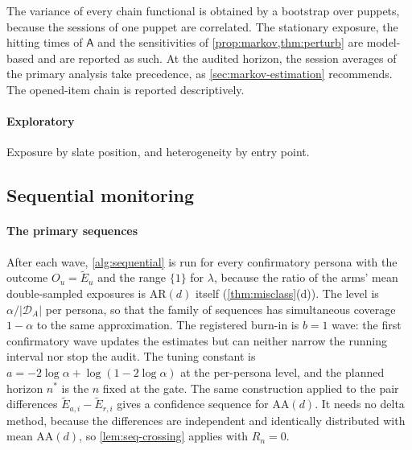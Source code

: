 The variance of every chain functional is obtained by a bootstrap over puppets, because the sessions of one puppet are correlated. The stationary exposure, the hitting times of $\mathsf A$ and the sensitivities of \cref{prop:markov,thm:perturb} are model-based and are reported as such. At the audited horizon, the session averages of the primary analysis take precedence, as \cref{sec:markov-estimation} recommends. The opened-item chain is reported descriptively.

\paragraph{Exploratory}
Exposure by slate position, and heterogeneity by entry point.

\subsection{Sequential monitoring}\label{sec:prot-monitoring}

\paragraph{The primary sequences}
After each wave, \cref{alg:sequential} is run for every confirmatory persona with the outcome $O_u=\widetilde E_u$ and the range $\{1\}$ for $\lambda$, because the ratio of the arms' mean double-sampled exposures is $\mathrm{AR}(d)$ itself (\cref{thm:misclass}(d)). The level is $\alpha/|\mathcal D_A|$ per persona, so that the family of sequences has simultaneous coverage $1-\alpha$ to the same approximation. The registered burn-in is $b=1$ wave: the first confirmatory wave updates the estimates but can neither narrow the running interval nor stop the audit. The tuning constant is $a=-2\log\alpha+\log(1-2\log\alpha)$ at the per-persona level, and the planned horizon $n^\ast$ is the $n$ fixed at the gate. The same construction applied to the pair differences $\widetilde E_{a,i}-\widetilde E_{r,i}$ gives a confidence sequence for $\mathrm{AA}(d)$. It needs no delta method, because the differences are independent and identically distributed with mean $\mathrm{AA}(d)$, so \cref{lem:seq-crossing} applies with $R_n=0$.

